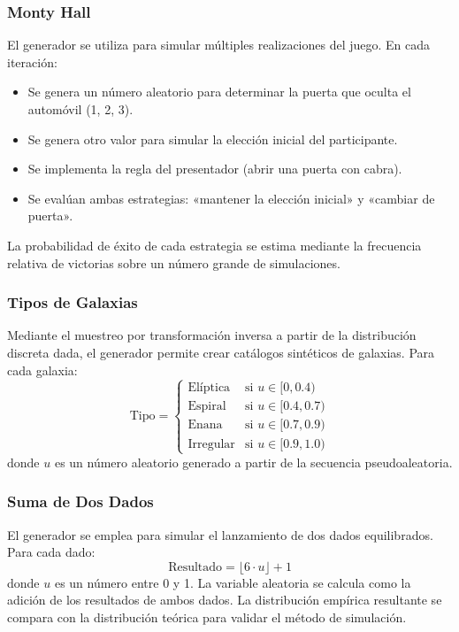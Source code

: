 \documentclass[baaa]{baaa}
\begin{document}
\subsubsection{Monty Hall}
El generador se utiliza para simular múltiples realizaciones del juego. En cada iteración:
\begin{itemize}


\item Se genera un número aleatorio para determinar la puerta que oculta el automóvil (1, 2, 3).

\item Se genera otro valor para simular la elección inicial del participante.

\item Se implementa la regla del presentador (abrir una puerta con cabra).

\item Se evalúan ambas estrategias: «mantener la elección inicial» y «cambiar de puerta».

\end{itemize}
La probabilidad de éxito de cada estrategia se estima mediante la frecuencia relativa de victorias sobre un número grande de simulaciones.

\subsubsection{Tipos de Galaxias}
Mediante el muestreo por transformación inversa a partir de la distribución discreta dada, el generador permite crear catálogos sintéticos de galaxias. Para cada galaxia:
\begin{equation*}
\text{Tipo} = 
\begin{cases}
\text{Elíptica}    & \text{si } u \in [0, 0.4) \\
\text{Espiral}     & \text{si } u \in [0.4, 0.7) \\
\text{Enana}       & \text{si } u \in [0.7, 0.9) \\
\text{Irregular}   & \text{si } u \in [0.9, 1.0)
\end{cases}
\end{equation*}
donde $u$ es un número aleatorio generado a partir de la secuencia pseudoaleatoria.

\subsubsection{Suma de Dos Dados}
El generador se emplea para simular el lanzamiento de dos dados equilibrados. Para cada dado:
\begin{equation*}
\text{Resultado} = \lfloor 6 \cdot u \rfloor + 1
\end{equation*}
donde $u$ es un número entre 0 y 1. La variable aleatoria se calcula como la adición de los resultados de ambos dados. La distribución empírica resultante se compara con la distribución teórica para validar el método de simulación.
\end{document}
